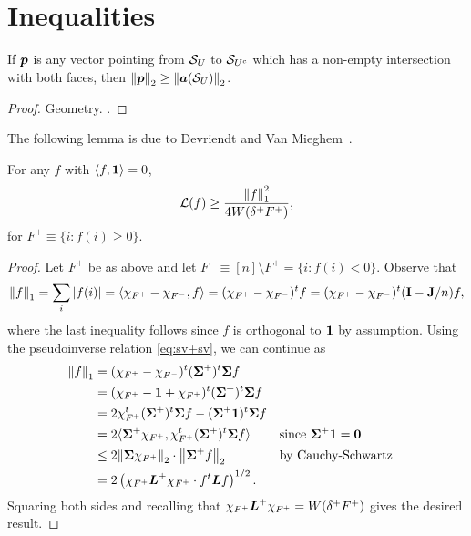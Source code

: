 \section{Inequalities}

\begin{lemma}
If $\vb*{p}$ is any vector pointing from $\mathcal{S}_U$ to $\mathcal{S}_{U^c}$ which has a non-empty intersection with both faces, then $\norm{\vb*{p}}_2 \geq \norm{\vb*{a}(\mathcal{S}_U)}_2$. 
\end{lemma}
\begin{proof}
Geometry. . 
\end{proof}

The following lemma is due to Devriendt and Van Mieghem~\cite{devriendt2018simplex}. 


\begin{lemma}
For any $f$ with $\langle f,\vb{1}\rangle=0$, \begin{equation*}
    \mathcal{L}(f) \geq \frac{\norm{f}_1^2}{4W(\delta^+F^+)},
\end{equation*}
for $F^+\equiv \{i:f(i)\geq 0\}$. 
\end{lemma}
\begin{proof}
Let $F^+$ be as above and let $F^-\equiv [n]\setminus F^+=\{i:f(i)<0\}$. Observe that 
\begin{equation*}
    \norm{f}_1=\sum_i |f(i)| = \langle \chi_{F^+}-\chi_{F^-},f\rangle = (\chi_{F^+}-\chi_{F^-})^t f = (\chi_{F^+}-\chi_{F^-})^t(\vb{I}-\vb{J}/n) f,
\end{equation*}
where the last inequality follows since $f$ is orthogonal to $\vb{1}$ by assumption. Using the pseudoinverse relation \eqref{eq:sv+sv}, we can continue as 
\begin{align*}
    \norm{f}_1 &= (\chi_{F^+}-\chi_{F^-})^t(\boldsymbol{\Sigma}^+)^t \boldsymbol{\Sigma} f \\
    &= (\chi_{F^+}-\vb{1} + \chi_{F^+})^t(\boldsymbol{\Sigma}^+)^t \boldsymbol{\Sigma} f \\
    &=2\chi_{F^+}^t (\boldsymbol{\Sigma}^+)^t \boldsymbol{\Sigma} f - (\boldsymbol{\Sigma}^+\vb{1})^t \boldsymbol{\Sigma} f \\
    &= 2\langle \boldsymbol{\Sigma}^+\chi_{F^+}, \chi_{F^+}^t (\boldsymbol{\Sigma}^+)^t \boldsymbol{\Sigma} f \rangle &&\text{since }\boldsymbol{\Sigma}^+\vb{1} =\vb{0}\\
    &\leq 2\norm{\boldsymbol{\Sigma}\chi_{F^+}}_2 \cdot \norm{\boldsymbol{\Sigma}^+ f}_2 &&\text{by Cauchy-Schwartz}\\
    &= 2\left(\chi_{F^+}\vb*{L}^+\chi_{F^+}\cdot f^t \vb*{L} f\right)^{1/2}.
\end{align*}
Squaring both sides and recalling that $\chi_{F^+}\vb*{L}^+\chi_{F^+} = W(\delta^+F^+)$ gives the desired result. 
\end{proof}

